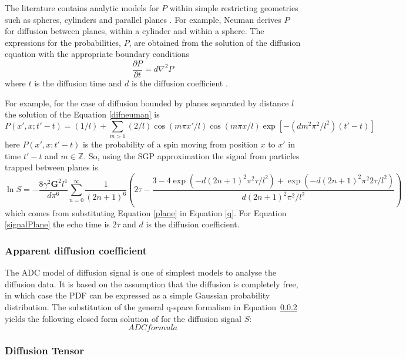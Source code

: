  The literature contains analytic models for $P$ within simple restricting geometries such as spheres, cylinders and parallel planes \cite{Callaghan,olle,Neuman}. For example, Neuman  \cite{Neuman} derives $P$ for  diffusion between planes, within a cylinder and within a sphere. The expressions  for the probabilities, $P$, are obtained from the solution of the diffusion equation with the appropriate boundary conditions
\begin{equation}
\frac{\partial P}{\partial t} = d\nabla^{2}P
\label{difneuman}
\end{equation}
where $t$ is the diffusion time and $d$ is the diffusion coefficient \cite{fourier}.

For example, for the case of diffusion bounded by planes separated by distance $l$ the solution of the Equation \ref{difneuman} is
\begin{equation}
P(x',x;t'-t) = (1/l) + \sum_{m>1}(2/l)\cos(m\pi x'/l)\cos(m\pi x/l)\exp[-(dm^{2}\pi^{2}/l^{2})(t'-t)]
\label{plane}
\end{equation}
here $P(x',x;t'-t)$ is the probability of a spin moving from position $x$ to $x'$ in time $t'-t$ and $m \in \mathbb{Z}$. So, using the SGP approximation the signal from particles trapped between planes is
\begin{equation}
\ln S = - \frac{8\gamma^{2}\textbf{G}^{2}l^{4}}{d\pi^{6}}\sum_{n=0}^{\infty}\frac{1}{(2n+1)^{6}}\left(2\tau - \frac{3-4\exp(-d(2n+1)^{2}\pi^{2}\tau/l^{2})+\exp(-d(2n+1)^{2}\pi^{2}2\tau/l^{2})}{d(2n+1)^{2}\pi^{2}/l^{2}}\right)
\label{signalPlane}
\end{equation} which comes from substituting Equation \ref{plane} in Equation \ref{q}. For Equation \ref{signalPlane}  the echo time is $2\tau$ and $d$ is the diffusion coefficient.
\subsubsection{Apparent diffusion coefficient}
The \gls{ADC} model of diffusion signal is one of simplest models to analyse the diffusion data. It is based on the assumption that the diffusion is completely free, in which case the PDF can be expressed as a simple Gaussian probability distribution. The substitution of the general q-space formalism in Equation~\ref{} yields the following closed form solution of for the diffusion signal $S$:
\begin{equation}
	ADC formula
\end{equation}

\subsubsection{Diffusion Tensor}
